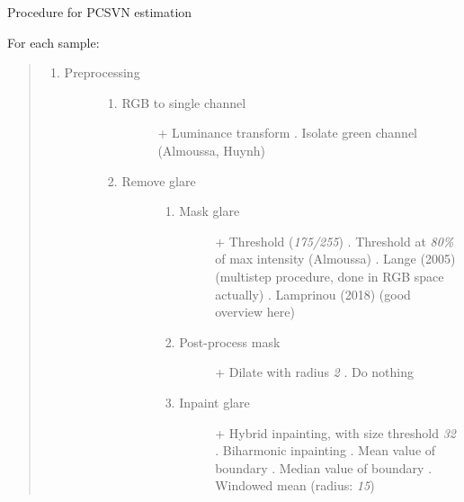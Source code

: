 Procedure for PCSVN estimation

For each sample:

\begin{quote}
\begin{enumerate}
\def\labelenumi{\Alph{enumi})}
\item
  \begin{description}
  \item[Preprocessing]
  \begin{enumerate}
  \def\labelenumii{\arabic{enumii})}
  \item
    \begin{description}
    \item[RGB to single channel]
    + Luminance transform . Isolate green channel (Almoussa, Huynh)
    \end{description}
  \item
    \begin{description}
    \item[Remove glare]
    \begin{enumerate}
    \def\labelenumiii{\alph{enumiii})}
    \item
      \begin{description}
      \item[Mask glare]
      + Threshold (\emph{175/255}) . Threshold at \emph{80\%} of max
      intensity (Almoussa) . Lange (2005) (multistep procedure, done in
      RGB space actually) . Lamprinou (2018) (good overview here)
      \end{description}
    \item
      \begin{description}
      \item[Post-process mask]
      + Dilate with radius \emph{2} . Do nothing
      \end{description}
    \item
      \begin{description}
      \item[Inpaint glare]
      + Hybrid inpainting, with size threshold \emph{32} . Biharmonic
      inpainting . Mean value of boundary . Median value of boundary .
      Windowed mean (radius: \emph{15})
      \end{description}
    \end{enumerate}
    \end{description}
  \end{enumerate}
  \end{description}
\end{enumerate}


\end{quote}
